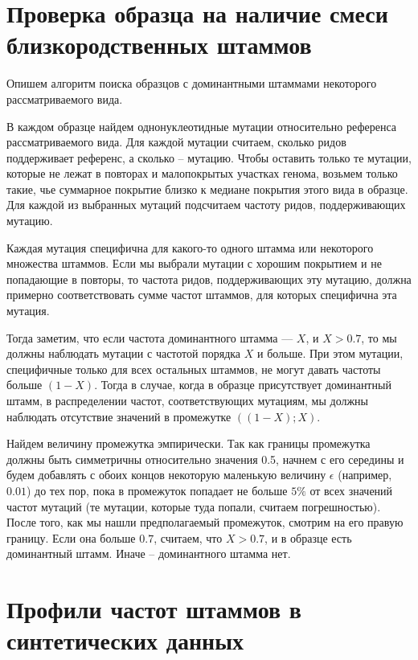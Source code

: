 \documentclass{spbau-diploma}
\begin{document}
\begin{appendices}

\section{Проверка образца на наличие смеси близкородственных штаммов}\label{dominated_samples}

Опишем алгоритм поиска образцов с доминантными штаммами некоторого рассматриваемого вида.

В каждом образце найдем однонуклеотидные мутации относительно референса рассматриваемого вида. Для каждой мутации считаем, сколько ридов поддерживает референс, а сколько – мутацию. Чтобы оставить только те мутации, которые не лежат в повторах и малопокрытых участках генома, возьмем только такие, чье суммарное покрытие близко к медиане покрытия этого вида в образце. Для каждой из выбранных мутаций подсчитаем частоту ридов, поддерживающих мутацию.

Каждая мутация специфична для какого-то одного штамма или некоторого множества штаммов. Если мы выбрали мутации с хорошим покрытием и не попадающие в повторы, то частота ридов, поддерживающих эту мутацию, должна примерно соответствовать сумме частот штаммов, для которых специфична эта мутация.

Тогда заметим, что если частота доминантного штамма --- $X$, и $X > 0.7$, то мы должны наблюдать мутации с частотой порядка $X$ и больше. При этом мутации, специфичные только для всех остальных штаммов, не могут давать частоты больше $(1-X)$. Тогда в случае, когда в образце присутствует доминантный штамм, в распределении частот, соответствующих мутациям, мы должны наблюдать отсутствие значений в промежутке $((1-X); X)$.

Найдем величину промежутка эмпирически. Так как границы промежутка должны быть симметричны относительно значения 0.5, начнем с его середины и будем добавлять с обоих концов некоторую маленькую величину $\epsilon$ (например, $0.01$) до тех пор, пока в промежуток попадает не больше $5\%$ от всех значений частот мутаций (те мутации, которые туда попали, считаем погрешностью). После того, как мы нашли предполагаемый промежуток, смотрим на его правую границу. Если она больше $0.7$, считаем, что $X > 0.7$, и в образце есть доминантный штамм. Иначе – доминантного штамма нет.


\section{Профили частот штаммов в синтетических данных}\label{app:profiles}


\end{appendices}
\end{document}
